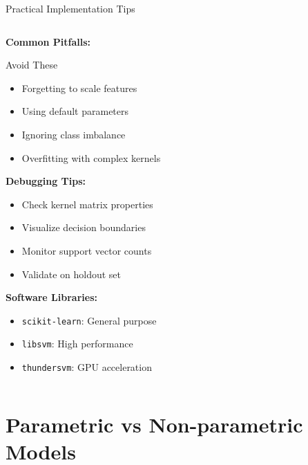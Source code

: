 \documentclass[8pt,aspectratio=1610]{beamer}
\begin{document}
\begin{frame}{Practical Implementation Tips}
\begin{columns}[t]
\begin{column}{0.48\textwidth}
\vspace{0.3cm}
\textbf{Common Pitfalls:}
\vspace{0.2cm}

\begin{alertblock}{Avoid These}
\begin{itemize}
\setlength{\itemsep}{1pt}
\item Forgetting to scale features
\item Using default parameters
\item Ignoring class imbalance
\item Overfitting with complex kernels
\end{itemize}
\end{alertblock}

\vspace{0.3cm}
\textbf{Debugging Tips:}
\begin{itemize}
\setlength{\itemsep}{1pt}
\item Check kernel matrix properties
\item Visualize decision boundaries
\item Monitor support vector counts
\item Validate on holdout set
\end{itemize}

\vspace{0.3cm}
\textbf{Software Libraries:}
\begin{itemize}
\setlength{\itemsep}{1pt}
\item \texttt{scikit-learn}: General purpose
\item \texttt{libsvm}: High performance
\item \texttt{thundersvm}: GPU acceleration
\end{itemize}
\end{column}
\end{columns}
\end{frame}

\section{Parametric vs Non-parametric Models}
\end{document}
